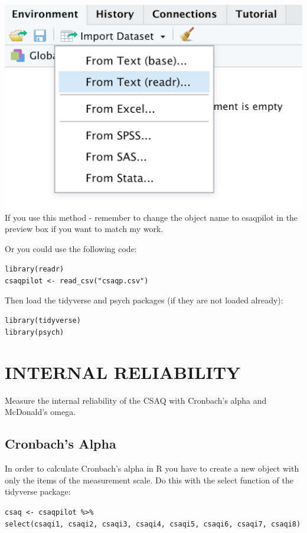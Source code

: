 \documentclass[
]{book}
\begin{document}
\includegraphics{img/4R.1.png}
If you use this method - remember to change the object name to csaqpilot in the preview box if you want to match my work.

Or you could use the following code:

\texttt{library(readr)}\\
\texttt{csaqpilot\ \textless{}-\ read\_csv("csaqp.csv")}

Then load the tidyverse and psych packages (if they are not loaded already):

\texttt{library(tidyverse)}\\
\texttt{library(psych)}

\hypertarget{internal-reliability}{%
\section{INTERNAL RELIABILITY}\label{internal-reliability}}

Measure the internal reliability of the CSAQ with Cronbach's alpha and McDonald's omega.

\hypertarget{cronbachs-alpha}{%
\subsection{Cronbach's Alpha}\label{cronbachs-alpha}}

In order to calculate Cronbach's alpha in R you have to create a new object with only the items of the measurement scale. Do this with the select function of the tidyverse package:

\texttt{csaq\ \textless{}-\ csaqpilot\ \%\textgreater{}\%}\\
\texttt{select(csaqi1,\ csaqi2,\ csaqi3,\ csaqi4,\ csaqi5,\ csaqi6,\ csaqi7,\ csaqi8)}
\end{document}
